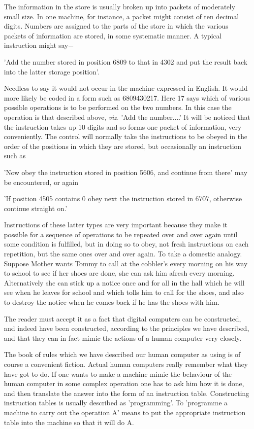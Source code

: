     The information in the store is usually broken up into packets of moderately small size. In one machine, for instance, a packet might consist of ten decimal digits. Numbers are assigned to the parts of the store in which the various packets of information are stored, in some systematic manner. A typical instruction might say$-$

    'Add the number stored in position 6809 to that in 4302 and put the result back into the latter storage position'.

    Needless to say it would not occur in the machine expressed in English. It would more likely be coded in a form such as 6809430217. Here 17 says which of various possible operations is to be performed on the two numbers. In this case the operation is that described above, \textit{viz.} 'Add the number....' It will be noticed that the instruction takes up 10 digits and so forms one packet of information, very conveniently. The control will normally take the instructions to be obeyed in the order of the positions in which they are stored, but occasionally an instruction such as

    'Now obey the instruction stored in position 5606, and continue from there' may be encountered, or again

    'If position 4505 contains 0 obey next the instruction stored in 6707, otherwise continue straight on.'

    Instructions of these latter types are very important because they make it possible for a sequence of operations to be repeated over and over again until some condition is fulfilled, but in doing so to obey, not fresh instructions on each repetition, but the same ones over and over again. To take a domestic analogy. Suppose Mother wants Tommy to call at the cobbler's every morning on his way to school to see if her shoes are done, she can ask him afresh every morning. Alternatively she can stick up a notice once and for all in the hall which he will see when he leaves for school and which tolls him to call for the shoes, and also to destroy the notice when he comes back if he has the shoes with him.

    The reader must accept it as a fact that digital computers can be constructed, and indeed have been constructed, according to the principles we have described, and that they can in fact mimic the actions of a human computer very closely.

    The book of rules which we have described our human computer as using is of course a convenient fiction. Actual human computers really remember what they have got to do. If one wants to make a machine mimic the behaviour of the human computer in some complex operation one has to ask him how it is done, and then translate the answer into the form of an instruction table. Constructing instruction tables is usually described as 'programming'. To 'programme a machine to carry out the operation A' means to put the appropriate instruction table into the machine so that it will do A.

